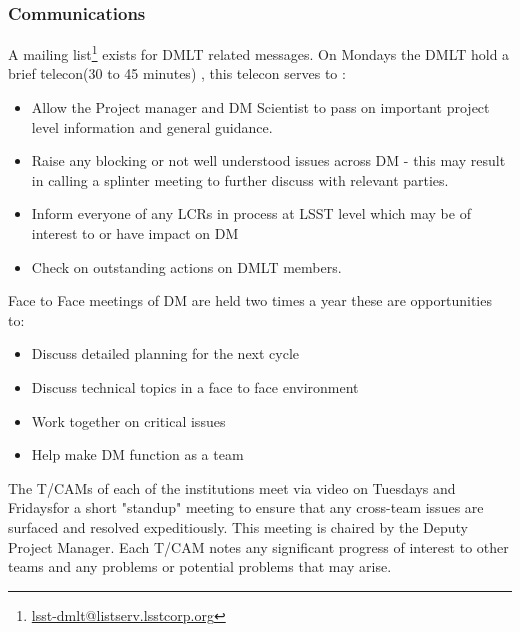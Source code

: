  \subsubsection{Communications} 
 A mailing list\footnote{\url{lsst-dmlt@listserv.lsstcorp.org}} exists for DMLT related messages. 
 On Mondays the DMLT hold a brief telecon(30 to 45 minutes) , this telecon serves to :
\begin{itemize}
\item Allow the Project manager and DM Scientist  to pass on important project level information and general guidance. 
\item Raise any blocking or not well understood issues across DM - this may result in calling a splinter meeting to further discuss with relevant parties.
\item Inform everyone of any LCRs in process at LSST level which may be of interest to or  have impact on DM
\item Check on outstanding actions on DMLT members. 
\end{itemize}

Face to Face meetings of DM are held two times a year these are opportunities to:
\begin{itemize}
\item Discuss detailed planning for the next cycle
\item Discuss technical topics in a face to face environment
\item Work together on critical issues
\item Help make DM function as a team
\end{itemize}

The T/CAMs of each of the institutions meet via video on Tuesdays and Fridaysfor a short "standup" meeting to ensure that any cross-team issues are surfaced and resolved expeditiously.
This meeting is chaired by the Deputy Project Manager.
Each T/CAM notes any significant progress of interest to other teams and any problems or potential problems that may arise.



